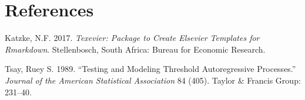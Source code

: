 \documentclass[11pt,preprint, authoryear]{elsarticle}
\numberwithin{equation}{section}
\numberwithin{figure}{section}
\numberwithin{table}{section}
\begin{document}
\section*{References}\label{references}

\hypertarget{refs}{}
\hypertarget{ref-Texevier}{}
Katzke, N.F. 2017. \emph{Texevier: Package to Create Elsevier Templates
for Rmarkdown}. Stellenbosch, South Africa: Bureau for Economic
Research.

\hypertarget{ref-Tsay1989}{}
Tsay, Ruey S. 1989. ``Testing and Modeling Threshold Autoregressive
Processes.'' \emph{Journal of the American Statistical Association} 84
(405). Taylor \& Francis Group: 231--40.




\end{document}
